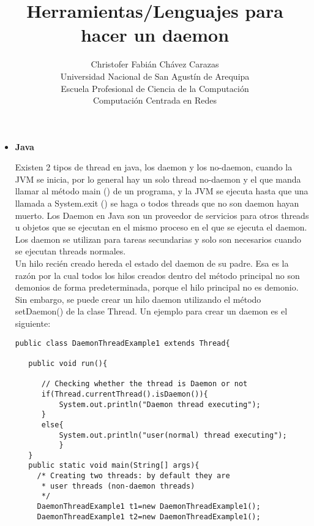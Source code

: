 \documentclass[a4paper,12pt]{article}
\begin{document}
\title{Herramientas/Lenguajes para hacer un daemon}
\author{
Christofer Fabián Chávez Carazas \\
\small{Universidad Nacional de San Agustín de Arequipa} \\
\small{Escuela Profesional de Ciencia de la Computación} \\
\small{Computación Centrada en Redes}
}
\date{}

\maketitle

\begin{itemize}
 \item \textbf{\large{Java}}
 
 Existen 2 tipos de thread en java, los daemon y los no-daemon, cuando la JVM se inicia, por lo general hay un solo thread no-daemon y el que manda llamar al método main () de un programa, y la JVM se ejecuta hasta que una llamada a System.exit () se haga o todos threads que no son daemon hayan muerto.
 Los Daemon en Java son un proveedor de servicios para otros threads u objetos que se ejecutan en el mismo proceso en el que se ejecuta el daemon. Los
 daemon se utilizan para tareas secundarias y solo son necesarios cuando se ejecutan threads normales. \\
 Un hilo recién creado hereda el estado del daemon de su padre. Esa es la razón por la cual todos los hilos creados dentro del método principal 
 no son demonios de forma predeterminada, porque el hilo principal no es demonio. Sin embargo, se puede crear un hilo daemon utilizando el método setDaemon() de la clase Thread.
 Un ejemplo para crear un daemon es el siguiente:
 
 \begin{lstlisting}
public class DaemonThreadExample1 extends Thread{

   public void run(){  
		
	  // Checking whether the thread is Daemon or not
	  if(Thread.currentThread().isDaemon()){ 
	      System.out.println("Daemon thread executing");  
	  }  
	  else{  
	      System.out.println("user(normal) thread executing");  
          }  
   }  
   public static void main(String[] args){  
	 /* Creating two threads: by default they are 
	  * user threads (non-daemon threads)
	  */
	 DaemonThreadExample1 t1=new DaemonThreadExample1();
	 DaemonThreadExample1 t2=new DaemonThreadExample1();   
			 

\end{lstlisting}
\end{itemize}
\end{document}
